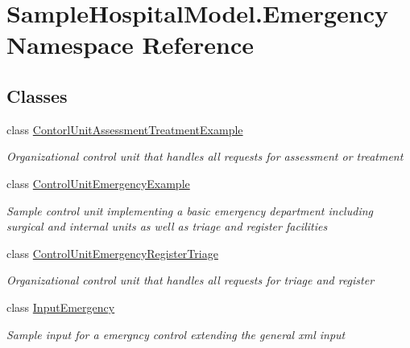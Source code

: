 \hypertarget{namespace_sample_hospital_model_1_1_emergency}{}\section{Sample\+Hospital\+Model.\+Emergency Namespace Reference}
\label{namespace_sample_hospital_model_1_1_emergency}
\subsection*{Classes}
\begin{DoxyCompactItemize}
\item 
class \hyperlink{class_sample_hospital_model_1_1_emergency_1_1_contorl_unit_assessment_treatment_example}{Contorl\+Unit\+Assessment\+Treatment\+Example}
\begin{DoxyCompactList}\small\item\em Organizational control unit that handles all requests for assessment or treatment \end{DoxyCompactList}\item 
class \hyperlink{class_sample_hospital_model_1_1_emergency_1_1_control_unit_emergency_example}{Control\+Unit\+Emergency\+Example}
\begin{DoxyCompactList}\small\item\em Sample control unit implementing a basic emergency department including surgical and internal units as well as triage and register facilities \end{DoxyCompactList}\item 
class \hyperlink{class_sample_hospital_model_1_1_emergency_1_1_control_unit_emergency_register_triage}{Control\+Unit\+Emergency\+Register\+Triage}
\begin{DoxyCompactList}\small\item\em Organizational control unit that handles all requests for triage and register \end{DoxyCompactList}\item 
class \hyperlink{class_sample_hospital_model_1_1_emergency_1_1_input_emergency}{Input\+Emergency}
\begin{DoxyCompactList}\small\item\em Sample input for a emergncy control extending the general xml input \end{DoxyCompactList}\end{DoxyCompactItemize}
